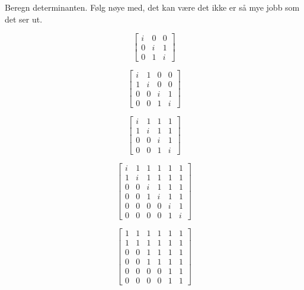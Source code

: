 \begin{oppgave}
Beregn determinanten. Følg nøye med,  det kan være det ikke er så mye jobb som det ser ut.
\begin{punkt}
\[
\begin{bmatrix}
 i & 0 & 0 \\  0 & i & 1 \\  0& 1  &i  
\end{bmatrix}
\]
\end{punkt}
\begin{punkt}
\[
\begin{bmatrix}
i & 1 & 0 & 0 \\ 1 & i & 0 & 0 \\ 0 & 0 & i & 1 \\ 0 & 0& 1  &i  
\end{bmatrix}
\]
\end{punkt}

\begin{punkt}
\[
\begin{bmatrix}
i & 1 & 1 & 1  \\ 1 & i & 1 & 1 \\ 0 & 0 & i & 1 \\ 0 & 0& 1  &i 
\end{bmatrix}
\]
\end{punkt}

\begin{punkt}
\[
\begin{bmatrix}
i & 1 & 1 & 1 & 1 & 1 \\ 1 & i & 1 & 1 & 1 & 1\\ 0 & 0 & i & 1& 1 & 1 \\ 0 & 0& 1  &i & 1 & 1 \\ 0 & 0 & 0 & 0 & i & 1\\ 0 & 0 & 0 & 0 & 1 & i 
\end{bmatrix}
\]
\end{punkt}

\begin{punkt}
\[
\begin{bmatrix}
1 & 1 & 1 & 1 & 1 & 1 \\ 1 & 1 & 1 & 1 & 1 & 1\\ 0 & 0 & 1 & 1& 1 & 1 \\ 0 & 0& 1  &1 & 1 & 1 \\ 0 & 0 & 0 & 0 & 1 & 1\\ 0 & 0 & 0 & 0 & 1 & 1 
\end{bmatrix}
\]
\end{punkt}

\end{oppgave}

